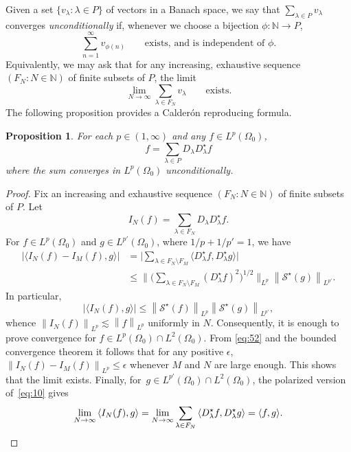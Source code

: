 \documentclass[a4paper]{amsart}
\newcommand{\sprod}[2]{{\langle #1, #2\rangle}}
\newcommand{\norm}[1]{{\left\lVert #1 \right\rVert}}
\newcommand{\abs}[1]{{\lvert {#1} \rvert}}
\newcommand{\seq}[2]{\left({#1}: {#2}\right)}
\newcommand{\NN}{\mathbb{N}}
\newcommand{\calS}{\mathcal{S}}
\theoremstyle{plain}
\newtheorem{proposition}{Proposition}[section]
\theoremstyle{definition}
\theoremstyle{remark}
\numberwithin{equation}{section}
\theoremstyle{plain}
\begin{document}
Given a set $\{v_\lambda : \lambda \in P\}$ of vectors in a Banach
space, we say that $\sum_{\lambda \in P} v_\lambda$ converges
\emph{unconditionally} if, whenever we choose a bijection $\phi: \NN
\rightarrow P$,
\begin{equation*}
\sum_{n = 1}^\infty v_{\phi(n)} \qquad 
\text{exists, and is independent of~$\phi$.}
\end{equation*}
Equivalently, we may ask that for any increasing, exhaustive sequence
$\seq{F_N}{N \in \NN}$ of finite subsets of $P$, the limit
\begin{equation*}
\lim_{N \to \infty} \sum_{\lambda \in F_N} v_\lambda 
\qquad \text{exists.}
\end{equation*}
The following proposition provides a Calder\'on reproducing formula.
\begin{proposition}
  \label{prop:2}
  For each $p \in (1, \infty)$ and any $f \in L^p(\Omega_0)$,
  \begin{equation*}
    f = \sum_{\lambda \in P} D_\lambda D_\lambda^\star f
  \end{equation*}
  where the sum converges in $L^p(\Omega_0)$ unconditionally.
\end{proposition}
\begin{proof}
Fix an increasing and exhaustive sequence $\seq{F_N}{N \in \NN}$ of
finite subsets of $P$. Let
\begin{equation*}
	I_N(f) = \sum_{\lambda \in F_N} D_\lambda D_\lambda^\star f.
\end{equation*}
For $f \in L^p(\Omega_0)$ and $g \in L^{p'}(\Omega_0)$, where $1/p +
1/{p'} = 1$, we have
\begin{equation}
\begin{aligned}
  \label{eq:52}
  \abs{\sprod{I_N(f) - I_M(f)}{g}} & = 
  \Big
  \lvert
  \sum_{\lambda \in F_N \setminus F_M}
  \sprod{D_\lambda^\star f}{D_\lambda^\star g}
  \Big
  \rvert \\
  & \leq
  \Big\lVert
  \Big( \sum_{\lambda \in F_N \setminus F_M} (D_\lambda^\star f)^2 \Big)^{1/2}
  \Big\rVert_{L^p}
  \norm{\calS^\star(g)}_{L^{p'}}.
\end{aligned}
\end{equation}
In particular,
\begin{equation*}
  \abs{\sprod{I_N(f)}{g}}
  \leq
  \norm{\calS^\star(f)}_{L^p} \norm{\calS^\star(g)}_{L^{p'}},
\end{equation*}
whence $\norm{I_N(f)}_{L^p} \lesssim \norm{f}_{L^p}$ uniformly in
$N$. Consequently, it is enough to prove convergence for $f \in
L^p(\Omega_0) \cap L^2(\Omega_0)$. From \eqref{eq:52} and the bounded
convergence theorem it follows that for any positive $\epsilon$,
$\norm{I_N(f) - I_M(f)}_{L^p} \leq \epsilon$ whenever $M$ and $N$ are
large enough.  This shows that the limit exists. Finally, for~$g \in
L^{p'}(\Omega_0)\cap L^2(\Omega_0)$, the polarized version
of~\eqref{eq:10} gives
\begin{equation*}
  \lim_{N \rightarrow \infty} \sprod{I_N(f)}{g} 
  = \lim_{N \rightarrow \infty} 
  \sum_{\lambda \in F_N} \sprod{D_\lambda^\star f}{D_\lambda^\star g} 
  = \sprod{f}{g}. \qedhere
\end{equation*}
\end{proof}
\end{document}
